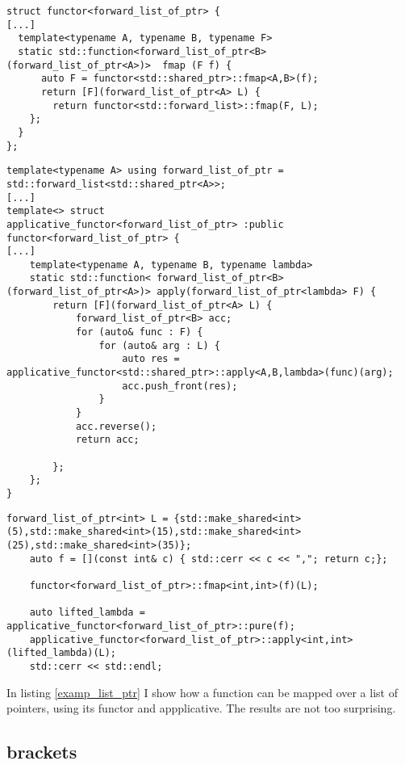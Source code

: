 \documentclass[12pt,fleqn]{article}
\begin{document}
\begin{lstlisting}[caption=fmap implementation for a list of shared pointers, label=fmap_ptr_lst]
struct functor<forward_list_of_ptr> {
[...]
  template<typename A, typename B, typename F>
  static std::function<forward_list_of_ptr<B> (forward_list_of_ptr<A>)>  fmap (F f) {
	  auto F = functor<std::shared_ptr>::fmap<A,B>(f);
	  return [F](forward_list_of_ptr<A> L) {
		return functor<std::forward_list>::fmap(F, L);
    };
  }
};
\end{lstlisting}
\begin{lstlisting}[caption=applicative functor for a list of shared pointers, label=apf_ptr_list]
template<typename A> using forward_list_of_ptr = std::forward_list<std::shared_ptr<A>>;
[...]
template<> struct 
applicative_functor<forward_list_of_ptr> :public functor<forward_list_of_ptr> {
[...]
    template<typename A, typename B, typename lambda>
    static std::function< forward_list_of_ptr<B> (forward_list_of_ptr<A>)> apply(forward_list_of_ptr<lambda> F) {
		return [F](forward_list_of_ptr<A> L) {
			forward_list_of_ptr<B> acc;
			for (auto& func : F) {
				for (auto& arg : L) {
					auto res = applicative_functor<std::shared_ptr>::apply<A,B,lambda>(func)(arg);
					acc.push_front(res);
				}
			} 
			acc.reverse();
			return acc;
			
		};
	};
}	
\end{lstlisting}

\begin{lstlisting}[caption=example for list of pointers, label=examp_list_ptr]
    forward_list_of_ptr<int> L = {std::make_shared<int>(5),std::make_shared<int>(15),std::make_shared<int>(25),std::make_shared<int>(35)};
    auto f = [](const int& c) { std::cerr << c << ","; return c;};

    functor<forward_list_of_ptr>::fmap<int,int>(f)(L);

    auto lifted_lambda = applicative_functor<forward_list_of_ptr>::pure(f);
    applicative_functor<forward_list_of_ptr>::apply<int,int>(lifted_lambda)(L);
	std::cerr << std::endl;
\end{lstlisting}

In listing \ref{examp_list_ptr} I show how a function can be mapped over a list of pointers, using its functor and appplicative.
The results are not too surprising.

\subsection*{brackets}
\end{document}

